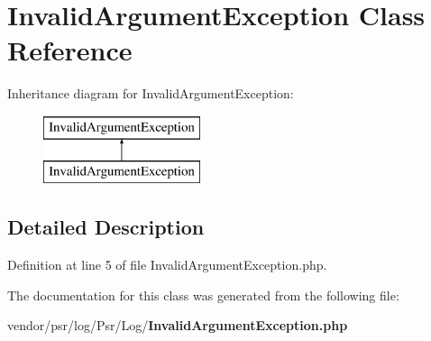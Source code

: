 \section{Invalid\+Argument\+Exception Class Reference}
\label{class_psr_1_1_log_1_1_invalid_argument_exception}
Inheritance diagram for Invalid\+Argument\+Exception\+:\begin{figure}[H]
\begin{center}
\leavevmode
\includegraphics[height=2.000000cm]{class_psr_1_1_log_1_1_invalid_argument_exception}
\end{center}
\end{figure}


\subsection{Detailed Description}


Definition at line 5 of file Invalid\+Argument\+Exception.\+php.



The documentation for this class was generated from the following file\+:\begin{DoxyCompactItemize}
\item 
vendor/psr/log/\+Psr/\+Log/{\bf Invalid\+Argument\+Exception.\+php}\end{DoxyCompactItemize}
